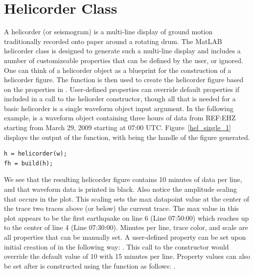 \documentclass[11pt]{article}
\begin{document}
\maketitle

\clearpage


\section{Helicorder Class}

A helicorder (or seismogram) is a multi-line display of ground motion traditionally recorded onto paper around a rotating drum. The MatLAB helicorder class is designed to generate such a multi-line display and includes a number of customizeable properties that can be defined by the user, or ignored. One can think of a helicorder object  as a blueprint for the construction of a helicorder figure. The  function is then used to create the helicorder figure based on the properties in . User-defined properties can override default properties if included in a call to the heliorder constructor, though all that is needed for a basic helicorder is a single waveform object input argument. In the following example,  is a waveform object containing three hours of data from REF:EHZ starting from March 29, 2009 starting at 07:00 UTC. Figure~\ref{hel_single_1} displays the output of the  function, with  being the handle of the figure generated.   

\begin{lstlisting}
h = helicorder(w);
fh = build(h);
\end{lstlisting}

We see that the resulting helicorder figure contains 10 minutes of data per line, and that waveform data is printed in black. Also notice the amplitude scaling that occurs in the plot. This scaling sets the max datapoint value at the center of the trace two traces above (or below) the current trace. The max value in this plot appears to be the first earthquake on line 6 (Line 07:50:00) which reaches up to the center of line 4 (Line 07:30:00). Minutes per line, trace color, and scale are all properties that can be manually set. A user-defined property can be set upon initial creation of  in the following way: . This call to the constructor would override the default value of 10 with 15 minutes per line. Property values can also be set after  is constructed using the  function as follows: .
\end{document}
